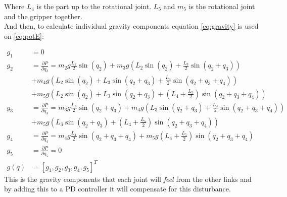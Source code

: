  Where $L_4$ is the part up to the rotational joint. $L_5$ and $m_5$ is the rotational joint and the gripper together.  \\
 
 And then, to calculate individual gravity components equation \eqref{eq:gravity} is used on \eqref{eq:potE}:

 \begin{align*}
    g_1 &= 0
    \\
    g_2 &= \frac{\partial P}{\partial q_2} = 
    m_2g\frac{L_2}{2}\sin{(q_2)}+
    m_3g\left( L_2 \sin{(q_2)} + \frac{L_3}{2}\sin{(q_2+q_3)} \right)\\&+
    m_4g\left( L_2 \sin{(q_2)} + L_3\sin{(q_2 + q_3)} + \frac{L_4}{2}\sin{(q_2+q_3+q_4)} \right)\\&+
    m_5g\left( L_2 \sin{(q_2)} + L_3\sin{(q_2 + q_3)} + \left(L_4 + \frac{L_5}{2} \right)\sin{(q_2+q_3+q_4)} \right)
    \\
    g_3 &= \frac{\partial P}{\partial q_3} =
    m_3g\frac{L_3}{2}\sin{(q_2+q_3)} +
    m_4g\left( L_3\sin{(q_2 + q_3)} + \frac{L_4}{2}\sin{(q_2+q_3+q_4)} \right)\\&+
    m_5g\left(  L_3\sin{(q_2 + q_3)} + \left(L_4 + \frac{L_5}{2} \right)\sin{(q_2+q_3+q_4)} \right)
    \\
    g_4 &=\frac{\partial P}{\partial q_4} = 
    m_4g\frac{L_4}{2}\sin{(q_2+q_3+q_4)}+
    m_5g\left(L_4 + \frac{L_5}{2} \right)\sin{(q_2+q_3+q_4)}
    \\
    g_5 &= \frac{\partial P}{\partial q_5} = 0
    \\
    g(q) &= [g_1,g_2,g_3,g_4,g_5]^T
 \end{align*}
This is the gravity components that each joint will \textit{feel} from the other links and by adding this to a PD controller it will compensate for this disturbance. 

